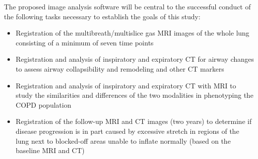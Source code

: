 \documentclass[11pt,]{article}
\providecommand{\tightlist}{%
  \setlength{\itemsep}{0pt}\setlength{\parskip}{0pt}}
\begin{document}
The proposed image analysis software will be central to the successful
conduct of the following tasks necessary to establish the goals of this
study:

\begin{itemize}
\tightlist
\item
  Registration of the multibreath/multislice gas MRI images of the whole
  lung consisting of a minimum of seven time points
\item
  Registration and analysis of inspiratory and expiratory CT for airway
  changes to assess airway collapsibility and remodeling and other CT
  markers
\item
  Registration and analysis of inspiratory and expiratory CT with MRI to
  study the similarities and differences of the two modalities in
  phenotyping the COPD population
\item
  Registration of the follow-up MRI and CT images (two years) to
  determine if disease progression is in part caused by excessive
  stretch in regions of the lung next to blocked-off areas unable to
  inflate normally (based on the baseline MRI and CT)
\end{itemize}
\end{document}
